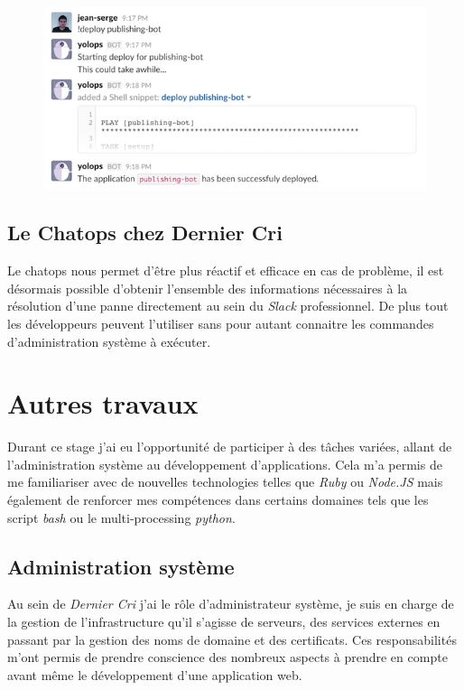 \begin{figure}[htbp]
\centering
\includegraphics{deploy.png}
\caption{}
\end{figure}

\newpage

\subsection{Le Chatops chez Dernier
Cri}\label{le-chatops-chez-dernier-cri}

Le chatops nous permet d'être plus réactif et efficace en cas de
problème, il est désormais possible d'obtenir l'ensemble des
informations nécessaires à la résolution d'une panne directement au sein
du \emph{Slack} professionnel. De plus tout les développeurs peuvent
l'utiliser sans pour autant connaitre les commandes d'administration
système à exécuter.

\newpage

\section{Autres travaux}\label{autres-travaux}

Durant ce stage j'ai eu l'opportunité de participer à des tâches
variées, allant de l'administration système au développement
d'applications. Cela m'a permis de me familiariser avec de nouvelles
technologies telles que \emph{Ruby} ou \emph{Node.JS} mais également de
renforcer mes compétences dans certains domaines tels que les script
\emph{bash} ou le multi-processing \emph{python}.

\subsection{Administration système}\label{administration-systuxe8me}

Au sein de \emph{Dernier Cri} j'ai le rôle d'administrateur système, je
suis en charge de la gestion de l'infrastructure qu'il s'agisse de
serveurs, des services externes en passant par la gestion des noms de
domaine et des certificats. Ces responsabilités m'ont permis de prendre
conscience des nombreux aspects à prendre en compte avant même le
développement d'une application web.

